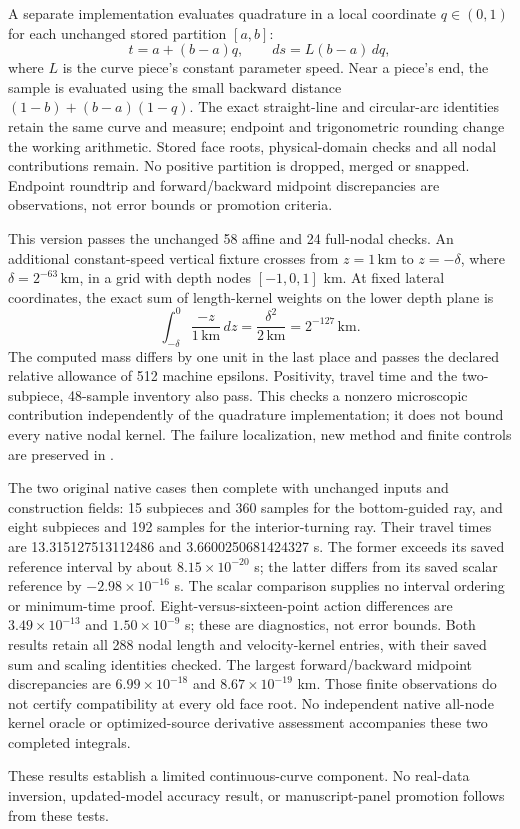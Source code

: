 A separate implementation evaluates quadrature in a local coordinate
$q\in(0,1)$ for each unchanged stored partition $[a,b]$:
\begin{equation}
 t=a+(b-a)q,\qquad ds=L(b-a)\,dq,
\end{equation}
where $L$ is the curve piece's constant parameter speed. Near a piece's end,
the sample is evaluated using the small backward distance
$(1-b)+(b-a)(1-q)$. The exact straight-line and circular-arc identities
retain the same curve and measure; endpoint and trigonometric rounding
change the working arithmetic. Stored face roots, physical-domain checks
and all nodal contributions remain. No positive partition is dropped,
merged or snapped. Endpoint roundtrip and forward/backward midpoint
discrepancies are observations, not error bounds or promotion criteria.

This version passes the unchanged 58 affine and 24 full-nodal checks.
An additional constant-speed vertical fixture crosses from $z=1\,\mathrm{km}$ to
$z=-\delta$, where $\delta=2^{-63}\,\mathrm{km}$, in a grid with depth nodes
$[-1,0,1]$ km. At fixed lateral coordinates, the exact sum of length-kernel
weights on the lower depth plane is
\begin{equation}
 \int_{-\delta}^{0}\frac{-z}{1\,\mathrm{km}}\,dz
 =\frac{\delta^2}{2\,\mathrm{km}}=2^{-127}\,\mathrm{km}.
\end{equation}
The computed mass differs by one unit in the last place and passes the declared
relative allowance of 512 machine epsilons. Positivity, travel time and
the two-subpiece, 48-sample inventory also pass. This checks a nonzero
microscopic contribution independently of the quadrature implementation;
it does not bound every native nodal kernel. The failure localization,
new method and finite controls are preserved in
.

The two original native cases then complete with unchanged inputs and
construction fields: 15 subpieces and 360 samples for the bottom-guided ray,
and eight subpieces and 192 samples for the interior-turning ray. Their
travel times are 13.315127513112486 and 3.6600250681424327 s. The former
exceeds its saved reference interval by about $8.15\times10^{-20}$ s; the
latter differs from its saved scalar reference by $-2.98\times10^{-16}$ s.
The scalar comparison supplies no interval ordering or minimum-time proof.
Eight-versus-sixteen-point action differences are $3.49\times10^{-13}$ and
$1.50\times10^{-9}$ s; these are diagnostics, not error bounds. Both results
retain all 288 nodal length and velocity-kernel entries, with their saved
sum and scaling identities checked. The largest forward/backward midpoint
discrepancies are $6.99\times10^{-18}$ and $8.67\times10^{-19}$ km. Those
finite observations do not certify compatibility at every old face root.
No independent native all-node kernel oracle or optimized-source derivative
assessment accompanies these two completed integrals.

These results establish a limited continuous-curve component. No real-data
inversion, updated-model accuracy result, or manuscript-panel promotion follows
from these tests.

